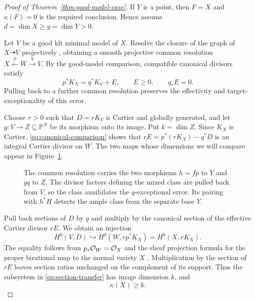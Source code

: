 \begin{proof}[Proof of Theorem~\ref{thm:good-model-case}]
If $Y$ is a point, then $F=X$ and $\kappa(F)=0$ is the required
conclusion. Hence assume $d=\dim X\geq y=\dim Y>0$.

Let $V$ be a good klt minimal model of $X$. Resolve the closure of
the graph of $X\dashrightarrow V$ projectively
\cite{Hironaka1964}, obtaining a smooth projective common resolution
$X\xleftarrow{p}W\xrightarrow{q}V$. By the good-model comparison,
compatible canonical divisors satisfy
\begin{equation}\label{eq:canonical-comparison}
 p^*K_X=q^*K_V+E,\qquad E\geq0,\qquad q_*E=0.
\end{equation}
Pulling back to a further common resolution preserves the effectivity
and target-exceptionality of this error.

Choose $r>0$ such that $D=rK_V$ is Cartier and globally generated,
and let $g\colon V\to Z\subseteq\mathbb P^N$ be its morphism onto
its image. Put $k=\dim Z$. Since $K_X$ is Cartier,
\eqref{eq:canonical-comparison} shows that
$rE=p^*(rK_X)-q^*D$ is an integral Cartier divisor on $W$.
The two maps whose dimensions we will compare appear in
Figure~\ref{fig:common-resolution}.

\begin{figure}[ht]
\centering
{}
\caption{The common resolution carries the two morphisms $h=fp$ to
$Y$ and $gq$ to $Z$.
The divisor factors defining the mixed class are pulled back from
$V$, so the class annihilates the
$q$-exceptional error. Its pairing with $h^*H$ detects the ample
class from the separate base $Y$.}
\label{fig:common-resolution}
\end{figure}

Pull back sections of $D$ by $q$ and multiply by the canonical
section of the effective Cartier divisor $rE$. We obtain an injection
\begin{equation}\label{eq:section-transfer}
 H^0(V,D)\hookrightarrow H^0(W,rp^*K_X)=H^0(X,rK_X).
\end{equation}
The equality follows from $p_*\mathcal O_W=\mathcal O_X$ and the sheaf projection
formula for the proper birational map to the normal variety $X$
\cite[III, Corollary~11.4 and its proof; II, Exercise~5.1(d)]{Hartshorne1977}.
Multiplication by the section of $rE$ leaves section ratios unchanged
on the complement of its support. Thus the subsystem in
\eqref{eq:section-transfer} has image dimension $k$, and
\begin{equation}\label{eq:canonical-image-lower-bound}
 \kappa(X)\geq k.
\end{equation}


\end{proof}
